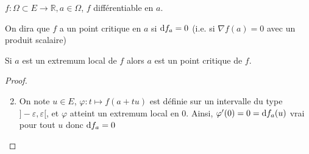 \begin{thmdef}
    \Hyp $f:\Omega\subset E\to \mathbb R, a\in \Omega$, $f$ différentiable en $a$.
    \begin{concenum}
    \item On dira que $f$ a un point critique en $a$ si $\mathrm{d} f_a=0$ (i.e. si $\nabla f(a)=0$ avec un produit scalaire)
    \item Si $a$ est un extremum local de $f$ alors $a$ est un point critique de $f$.
    \end{concenum}
\end{thmdef}

\begin{proof}
    \begin{enumerate}
        \setcounter{enumi}{1}
    \item On note $u\in E$, $\varphi: t\longmapsto f(a+tu)$ est définie sur un intervalle du type $]-\varepsilon, \varepsilon[$, et $\varphi$ atteint un extremum local en $0$. Ainsi, $\varphi'(0)=0=\mathrm{d} f_a(u)$ vrai pour tout $u$ donc $\mathrm{d} f_a=0$
\end{enumerate}
\end{proof}

